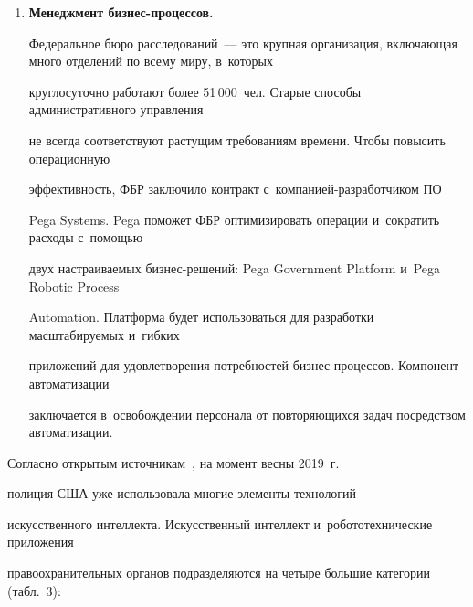 \begin{enumerate}[1.]
них~--- Javelin, которая следит за внут\-рен\-ни\-ми проступками, нарушениями безопасности


и~внутренним шпионажем. Другая~--- это платформа анализа внутренних угроз (InTAP), которая


просматривает большие объемы данных, чтобы найти шаблоны, ука\-зы\-ва\-ющие на


подозрительные действия и~потенциальные угрозы для организации. Обе эти программы


находятся в~стадии реализации.


\item %


\textbf{Менеджмент бизнес-процессов.}


Федеральное бюро расследований~--- это крупная организация, включающая много отделений по всему миру, в~которых


круглосуточно работают более 51\,000~чел. Старые способы административного управ\-ле\-ния


не всегда соответствуют растущим требованиям времени. Чтобы повысить операционную


эффективность, ФБР заключило контракт с~ком\-па\-ни\-ей-раз\-ра\-бот\-чи\-ком ПО


Pega Systems. Pega поможет ФБР оптимизировать операции и~сократить расходы с~по\-мощью


двух настраиваемых биз\-нес-ре\-ше\-ний: Pega Government Platform и~Pega Robotic Process


Automation. Платформа будет использоваться для разработки масштабируемых и~гибких


приложений для удовлетворения потребностей биз\-нес-про\-цес\-сов. Компонент автоматизации


заключается в~освобождении персонала от повторяющихся задач посредством автоматизации.


  \end{enumerate}








  Согласно открытым источникам~\cite{17-bor}, на момент весны 2019~г.\


{полиция США} уже использовала многие элементы технологий


искусственного интеллекта. Искусственный интеллект и~робототехнические приложения


правоохранительных органов подразделяются на четыре большие категории (табл.~3):


